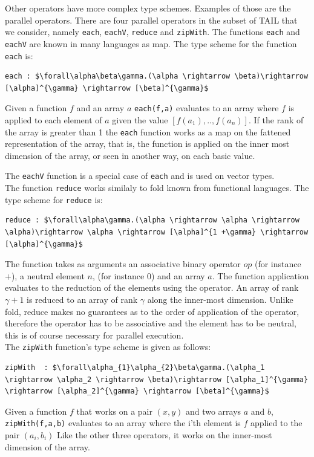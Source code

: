 \documentclass[11pt]{article}
\begin{document}
Other operators have more complex type schemes. Examples of those are the parallel operators. 
There are four parallel operators in the subset of TAIL that we consider, namely {\tt each}, {\tt eachV}, {\tt reduce} and {\tt zipWith}.
The functions {\tt each} and {\tt eachV} are known in many languages as map.
The type scheme for the function {\tt each} is:
\begin{lstlisting}[numbers=none,frame=none]
each : $\forall\alpha\beta\gamma.(\alpha \rightarrow \beta)\rightarrow [\alpha]^{\gamma} \rightarrow [\beta]^{\gamma}$
\end{lstlisting}
Given a function $f$ and an array $a$ {\tt each(f,a)} evaluates to an array where $f$ is applied to each element of $a$ given the value $[f(a_1),..,f(a_n)]$.
If the rank of the array is greater than 1 the {\tt each} function works as a map on the fattened representation of the array,
that is, the function is applied on the inner most dimension of the array, or seen in another way, on each basic value.

The {\tt eachV} function is a special case of {\tt each} and is used on vector types.\\

The function {\tt reduce} works similaly to fold known from functional languages. The type scheme for {\tt reduce} is:
\begin{lstlisting}[numbers=none,frame=none]
reduce : $\forall\alpha\gamma.(\alpha \rightarrow \alpha \rightarrow \alpha)\rightarrow \alpha \rightarrow [\alpha]^{1 +\gamma} \rightarrow [\alpha]^{\gamma}$
\end{lstlisting}
The function takes as arguments an associative binary operator $op$ (for instance $+$), a neutral element $n$, (for instance 0) and an array $a$.
The function application evaluates to the reduction of the elements using the operator.
An array of rank $\gamma+1$ is reduced to an array of rank $\gamma$ along the inner-most dimension.
Unlike fold, reduce makes no guarantees as to the order of application of the operator, therefore the operator has to be associative and the element has to be neutral, this is of course necessary for parallel execution.\\

The {\tt zipWith} function's type scheme is given as follows: 
\begin{lstlisting}[numbers=none,frame=none]
zipWith  : $\forall\alpha_{1}\alpha_{2}\beta\gamma.(\alpha_1 \rightarrow \alpha_2 \rightarrow \beta)\rightarrow [\alpha_1]^{\gamma} \rightarrow [\alpha_2]^{\gamma} \rightarrow [\beta]^{\gamma}$
\end{lstlisting}
Given a function $f$ that works on a pair $(x,y)$ and two arrays $a$ and $b$, {\tt zipWith(f,a,b)}  evaluates to an array where the i'th element is $f$ applied to the pair $(a_i,b_i)$ 
Like the other three operators, it works on the inner-most dimension of the array\cite{ElsmanDybdal:Array:2014}.\\
\end{document}
